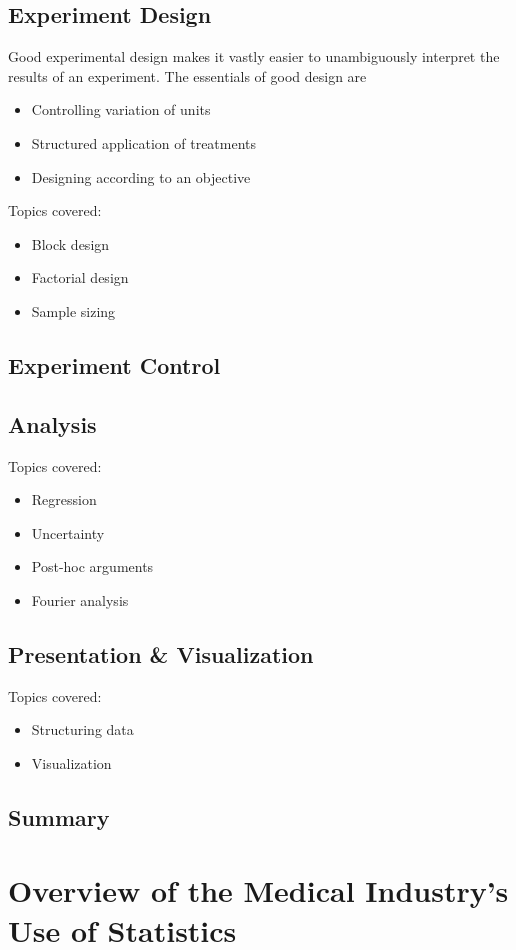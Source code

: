 \documentclass[11pt,a4paper,article]{memoir} %
\begin{document}
\section{Experiment Design}
Good experimental design makes it vastly easier to unambiguously interpret the results of an experiment. The essentials of good design are
\begin{itemize}
\item Controlling variation of units
\item Structured application of treatments
\item Designing according to an objective
\end{itemize}
Topics covered:
\begin{itemize}
\item Block design
\item Factorial design
\item Sample sizing
\end{itemize}

\section{Experiment Control}

\section{Analysis}
Topics covered:
\begin{itemize}
\item Regression
\item Uncertainty
\item Post-hoc arguments
\item Fourier analysis
\end{itemize}

\section{Presentation \& Visualization}
Topics covered:
\begin{itemize}
\item Structuring data
\item Visualization
\end{itemize}

\section{Summary}


\chapter{Overview of the Medical Industry's Use of Statistics}\label{industry_context} %
\end{document}
